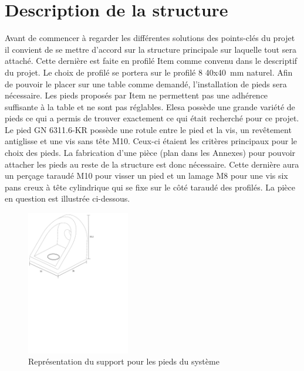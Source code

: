 \section{Description de la structure}\label{sec:DescStruct}
Avant de commencer à regarder les différentes solutions des points-clés du projet il convient de se mettre d'accord
sur la structure principale sur laquelle tout sera attaché. Cette dernière est faite en profilé Item \cite{Item} comme convenu dans le descriptif
du projet. Le choix de profilé se portera sur le profilé 8 40x40~mm naturel. Afin de pouvoir le placer sur une table comme demandé, l'installation de pieds sera nécessaire. Les pieds proposés par Item ne
permettent pas une adhérence suffisante à la table et ne sont pas réglables. Elesa \cite{Elesa} possède une grande variété de pieds ce qui
a permis de trouver exactement ce qui était recherché pour ce projet. Le pied GN 6311.6-KR possède une rotule entre le pied
et la vis, un revêtement antiglisse et une vis sans tête M10. Ceux-ci étaient les critères principaux pour le choix des pieds. La fabrication d'une pièce (plan dans les Annexes) pour pouvoir attacher
les pieds au reste de la structure est donc nécessaire. Cette dernière aura un perçage taraudé M10 pour visser un pied et un lamage M8 pour
une vis six pans creux à tête cylindrique qui se fixe sur le côté taraudé des profilés. La pièce en question est illustrée ci-dessous.

\begin{figure}[H]
    \centering
    \includegraphics[width = 0.4\textwidth]{assets/figures/SupportPieds.svg}
    \caption{Représentation du support pour les pieds du système}
    \label{fig:SupPieds}
\end{figure}

